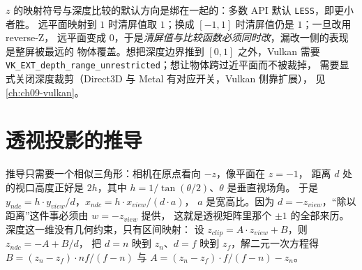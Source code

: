 \documentclass[12pt,a4paper,fontset=fandol]{ctexbook}
\newcommand{\Tp}[1]{\texttt{#1}}
\newcommand{\Bk}{\discretionary{}{}{}}
\begin{document}
\begin{warning}[title={深度范围不是只有 0 与 1 的差别}]
  $z$ 的映射符号与深度比较的默认方向是绑在一起的：多数 API 默认 \Tp{LESS}，即更小者胜。
  远平面映射到 $1$ 时清屏值取 $1$；换成 $[-1,1]$ 时清屏值仍是 $1$；一旦改用 reverse-Z，
  远平面变成 $0$，于是\emph{清屏值与比较函数必须同时改}，漏改一侧的表现是整屏被最远的
  物体覆盖。想把深度边界推到 $[0,1]$ 之外，Vulkan 需要
  \Tp{VK\_\Bk EXT\_\Bk depth\_\Bk range\_\Bk unrestricted}；想让物体跨过近平面而不被裁掉，
  需要显式关闭深度裁剪（Direct3D 与 Metal 有对应开关，Vulkan 侧靠扩展），
  见 \ref{ch:ch09-vulkan}。
\end{warning}

\section{透视投影的推导}

推导只需要一个相似三角形：相机在原点看向 $-z$，像平面在 $z = -1$，
距离 $d$ 处的视口高度正好是 $2h$，其中 $h = 1/\tan(\theta/2)$、$\theta$ 是垂直视场角。
于是 $y_{ndc} = h \cdot y_{view} / d$，$x_{ndc} = h \cdot x_{view} / (d \cdot a)$，
$a$ 是宽高比。因为 $d = -z_{view}$，``除以距离''这件事必须由 $w = -z_{view}$ 提供，
这就是透视矩阵里那个 $\pm 1$ 的全部来历。深度这一维没有几何约束，只有区间映射：
设 $z_{clip} = A \cdot z_{view} + B$，则 $z_{ndc} = -A + B/d$，
把 $d = n$ 映到 $z_n$、$d = f$ 映到 $z_f$，解二元一次方程得
$B = (z_n - z_f) \cdot nf/(f - n)$ 与 $A = (z_n - z_f) \cdot f/(f - n) - z_n$。
\end{document}
